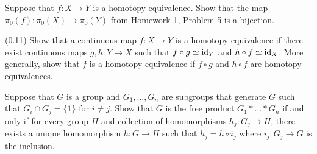 \documentclass[12pt]{article}
\begin{document}


\begin{problab}{1}
    Suppose that $f: X \to Y$ is a homotopy equivalence. Show that the map $\pi_0(f): \pi_0(X) \to \pi_0(Y)$ from Homework 1, Problem 5 is a bijection.
\end{problab}
\begin{solu}

\end{solu}
\newpage

\begin{problab}{2}
    (0.11) Show that a continuous map $f: X \to Y$ is a homotopy equivalence if there exist continuous maps $g, h: Y \to X$ such that $f\circ g \simeq \operatorname{id}_Y$ and $h \circ f \simeq \operatorname{id}_X$. More generally, show that $f$ is a homotopy equivalence if $f \circ g$ and $h \circ f$ are homotopy equivalences.
\end{problab}
\begin{solu}
    
\end{solu}
\newpage

\begin{problab}{3}
    Suppose that $G$ is a group and $G_1, \hdots, G_n$ are subgroups that generate $G$ such that $G_i \cap G_j = \{ 1 \}$ for $i \neq j$. Show that $G$ is the free product $G_1 * \hdots * G_n$ if and only if for every group $H$ and collection of homomorphisms $h_j : G_j \to H$, there exists a unique homomorphism $h: G \to H$ such that $h_j = h \circ i_j$ where $i_j: G_j \to G$ is the inclusion.
\end{problab}
\begin{solu}

\end{solu}
\newpage
\end{document}
